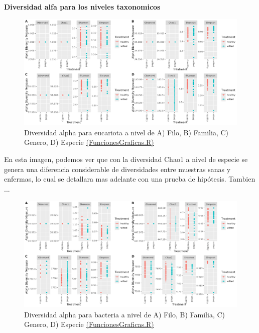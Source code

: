 \textbf{Diversidad alfa para los niveles taxonomicos}

\begin{figure}[h]
\centering
\includegraphics[width=\textwidth]{Img/cap2/Alpha_Eukarya.png}
\caption{Diversidad alpha para eucariota a nivel de A) Filo, B) Familia, C) Genero, D) Especie \href{https://github.com/CamilaSilva1995/Tesis_Maestria/blob/main/Analisis_Comparativo/Fresa_Solena/20230227_Funciones&Graficas.R}{(FuncionesGraficas.R)}}
\end{figure}

En esta imagen, podemos ver que con la diversidad Chao1 a nivel de especie se genera una diferencia considerable de diversidades entre muestras sanas y enfermas, lo cual se detallara mas adelante con una prueba de hipótesis. Tambien ...

\begin{figure}[h]
\centering
\includegraphics[width=\textwidth]{Img/cap2/Alpha_Bacteria.png}
\caption{Diversidad alpha para bacteria a nivel de A) Filo, B) Familia, C) Genero, D) Especie \href{https://github.com/CamilaSilva1995/Tesis_Maestria/blob/main/Analisis_Comparativo/Fresa_Solena/20230227_Funciones&Graficas.R}{(FuncionesGraficas.R)}}
\end{figure}


